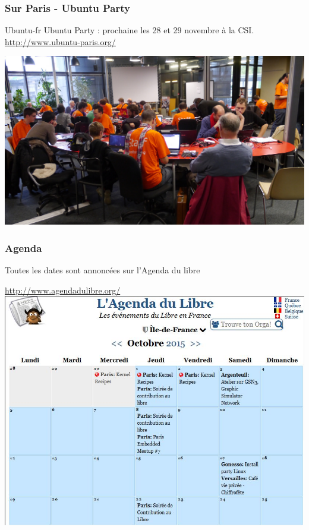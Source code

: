 \documentclass{beamer}
\begin{document}
\begin{frame}
\frametitle{Sur Paris - Ubuntu Party}
\begin{block}{Ubuntu-fr}
Ubuntu Party : prochaine les 28 et 29 novembre à la CSI.\\
\url{http://www.ubuntu-paris.org/}
\end{block}
\begin{center}
\includegraphics[scale=0.3] {./images/ubuntu-paris.jpg}
\end{center} 
\end{frame}
\begin{frame}
\frametitle{Agenda}
Toutes les dates sont annoncées sur l'Agenda du libre 
\begin{center}
\url{http://www.agendadulibre.org/}
\\
\includegraphics[scale=0.55] {./images/agenda-du-libre.jpg}
\end{center} 
\end{frame}
\end{document}
